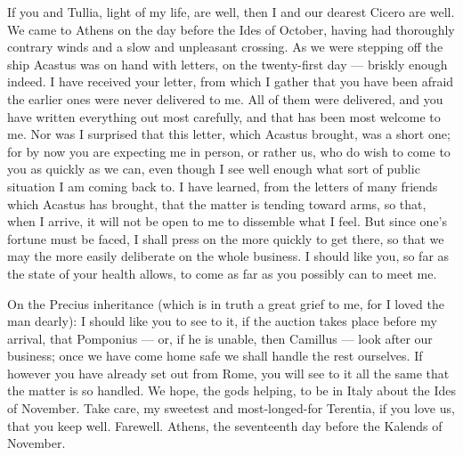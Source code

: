 

 If you and Tullia, light of my life, are well, then I and our dearest Cicero are well. We came to Athens on the day before the Ides of October, having had thoroughly contrary winds and a slow and unpleasant crossing. As we were stepping off the ship Acastus was on hand with letters, on the twenty-first day --- briskly enough indeed. I have received your letter, from which I gather that you have been afraid the earlier ones were never delivered to me. All of them were delivered, and you have written everything out most carefully, and that has been most welcome to me. Nor was I surprised that this letter, which Acastus brought, was a short one; for by now you are expecting me in person, or rather us, who do wish to come to you as quickly as we can, even though I see well enough what sort of public situation I am coming back to. I have learned, from the letters of many friends which Acastus has brought, that the matter is tending toward arms, so that, when I arrive, it will not be open to me to dissemble what I feel. But since one's fortune must be faced, I shall press on the more quickly to get there, so that we may the more easily deliberate on the whole business. I should like you, so far as the state of your health allows, to come as far as you possibly can to meet me.

 On the Precius inheritance (which is in truth a great grief to me, for I loved the man dearly): I should like you to see to it, if the auction takes place before my arrival, that Pomponius --- or, if he is unable, then Camillus --- look after our business; once we have come home safe we shall handle the rest ourselves. If however you have already set out from Rome, you will see to it all the same that the matter is so handled. We hope, the gods helping, to be in Italy about the Ides of November. Take care, my sweetest and most-longed-for Terentia, if you love us, that you keep well. Farewell. Athens, the seventeenth day before the Kalends of November.
